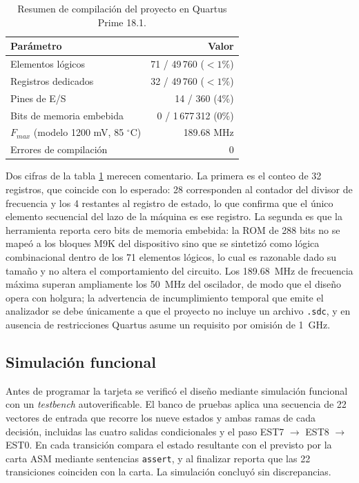 \begin{table}[H]
  \centering
  \caption{Resumen de compilación del proyecto en Quartus Prime 18.1.}
  \label{tab:sintesis}
  \begin{tabular}{@{}l r@{}}
    \toprule
    \textbf{Parámetro} & \textbf{Valor} \\
    \midrule
    Elementos lógicos            & 71 / 49\,760 ($<1\%$) \\
    Registros dedicados          & 32 / 49\,760 ($<1\%$) \\
    Pines de E/S                 & 14 / 360 (4\%) \\
    Bits de memoria embebida     & 0 / 1\,677\,312 (0\%) \\
    $F_{max}$ (modelo 1200 mV, 85 $^\circ$C) & 189.68 MHz \\
    Errores de compilación       & 0 \\
    \bottomrule
  \end{tabular}
\end{table}

Dos cifras de la tabla \ref{tab:sintesis} merecen comentario. La primera es el conteo de 32
registros, que coincide con lo esperado: 28 corresponden al contador del divisor de
frecuencia y los 4 restantes al registro de estado, lo que confirma que el único elemento
secuencial del lazo de la máquina es ese registro. La segunda es que la herramienta reporta
cero bits de memoria embebida: la ROM de 288 bits no se mapeó a los bloques M9K del
dispositivo sino que se sintetizó como lógica combinacional dentro de los 71 elementos
lógicos, lo cual es razonable dado su tamaño y no altera el comportamiento del circuito.
Los 189.68~MHz de frecuencia máxima superan ampliamente los 50~MHz del oscilador, de modo
que el diseño opera con holgura; la advertencia de incumplimiento temporal que emite el
analizador se debe únicamente a que el proyecto no incluye un archivo \texttt{.sdc}, y en
ausencia de restricciones Quartus asume un requisito por omisión de 1~GHz.

\subsection{Simulación funcional}

Antes de programar la tarjeta se verificó el diseño mediante simulación funcional con
un \textit{testbench} autoverificable. El banco de pruebas aplica una secuencia de 22
vectores de entrada que recorre los nueve estados y ambas ramas de cada decisión, incluidas
las cuatro salidas condicionales y el paso EST7 $\rightarrow$ EST8 $\rightarrow$ EST0. En cada
transición compara el estado resultante con el previsto por la carta ASM mediante sentencias
\texttt{assert}, y al finalizar reporta que las 22 transiciones coinciden con la carta. La
simulación concluyó sin discrepancias.

